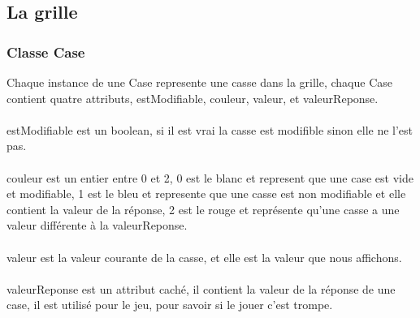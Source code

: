 \documentclass{article}
\begin{document}
\subsection{La grille}
\subsubsection{Classe Case}
Chaque instance de une Case represente une casse dans la grille, chaque Case contient quatre attributs, estModifiable, couleur, valeur, et valeurReponse.
\\
\\
estModifiable est un boolean, si il est vrai la casse est modifible sinon elle ne l’est pas.
\\
\\
couleur est un entier entre 0 et 2, 0 est le blanc et represent que une case est vide et modifiable, 1 est le bleu et represente que une casse est non modifiable et elle contient la valeur de la réponse, 2 est le rouge et 
représente qu'une casse a une valeur différente à la valeurReponse.
\\
\\
valeur est la valeur courante de la casse, et elle est la valeur que  nous affichons.
\\
\\
valeurReponse est un attribut caché, il contient la valeur de la réponse de une case, il est utilisé pour le jeu, pour savoir si le jouer c’est trompe.
\end{document}
